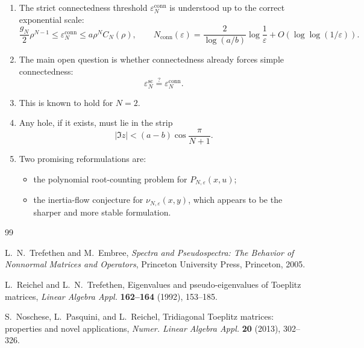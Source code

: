 \documentclass[11pt]{article}
\newcommand{\eps}{\varepsilon}
\newcommand{\conn}{\mathrm{conn}}
\newcommand{\scn}{\mathrm{sc}}
\begin{document}
\begin{enumerate}
\item The strict connectedness threshold \(\eps_N^{\conn}\) is understood up to the correct exponential scale:
\[
\frac{g_N}{2}\rho^{N-1}\le \eps_N^{\conn}\le a\rho^N C_N(\rho),
\qquad
N_{\conn}(\eps)=\frac{2}{\log(a/b)}\log\frac1\eps+O(\log\log(1/\eps)).
\]

\item The main open question is whether connectedness already forces simple connectedness:
\[
\eps_N^{\scn}\stackrel{?}= \eps_N^{\conn}.
\]

\item This is known to hold for \(N=2\).

\item Any hole, if it exists, must lie in the strip
\[
|\Im z|<(a-b)\cos\frac{\pi}{N+1}.
\]

\item Two promising reformulations are:
\begin{itemize}
\item the polynomial root-counting problem for \(P_{N,\eps}(x,u)\);
\item the inertia-flow conjecture for \(\nu_{N,\eps}(x,y)\), which appears to be the sharper and more stable formulation.
\end{itemize}
\end{enumerate}

\begin{thebibliography}{99}

L.~N.~Trefethen and M.~Embree,
\emph{Spectra and Pseudospectra: The Behavior of Nonnormal Matrices and Operators},
Princeton University Press, Princeton, 2005.

L.~Reichel and L.~N.~Trefethen,
Eigenvalues and pseudo-eigenvalues of Toeplitz matrices,
\emph{Linear Algebra Appl.} \textbf{162--164} (1992), 153--185.

S.~Noschese, L.~Pasquini, and L.~Reichel,
Tridiagonal Toeplitz matrices: properties and novel applications,
\emph{Numer. Linear Algebra Appl.} \textbf{20} (2013), 302--326.

\end{thebibliography}
\end{document}
